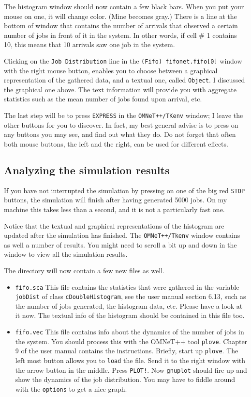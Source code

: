 \documentclass[a4paper]{article}
\begin{document}
The histogram window should now contain a few black bars. When you put
your mouse on one, it will change color. (Mine becomes gray.) There is
a line at the bottom of window that contains the number of arrivals
that observed a certain number of jobs in front of it in the system.
In other words, if cell \# 1 contains 10, this means that 10 arrivals
saw one job in the system.

Clicking on the \texttt{Job Distribution} line in the
\texttt{(Fifo) fifonet.fifo[0]} window with the right mouse button, enables
you to choose between a graphical representation of the gathered data,
and a textual one, called \texttt{Object}. I discussed the graphical
one above. The text information will provide you with aggregate statistics
such as the mean number of jobs found upon arrival, etc.

The last step will be to press \texttt{EXPRESS} in the
\texttt{OMNeT++/TKenv} window; I leave the other
buttons for you to discover. In fact, my best general advise is to
press on any buttons you may see, and find out what they do. Do not
forget that often both mouse buttons, the left and the right, can be
used for different effects.


\subsection{Analyzing the simulation results}
\label{sec:interpreting-results}
If you have not interrupted the simulation by pressing on one of the
big red \texttt{STOP} buttons, the simulation will finish
after having generated 5000 jobs. On my machine this takes less than a
second, and it is not a particularly fast one.

Notice that the textual and graphical representations of the histogram
are updated after the simulation has finished. The
\texttt{OMNeT++/Tkenv} window contains as well a number of results.
You might need to scroll a bit up and down in the window to view all
the simulation results.

The directory will now contain a few new files as well.
\begin{itemize}
\item \texttt{fifo.sca} This file contains the statistics that were
  gathered in the variable \texttt{jobDist} of class
  \texttt{cDoubleHistogram}, see the user manual section 6.13, such as
  the number of jobs generated, the histogram data, etc. Please have a
  look at it now.  The textual info of the histogram should be
  contained in this file too.
\item \texttt{fifo.vec} This file contains info about the dynamics of
  the number of jobs in the system. You should process this with the
  OMNeT++ tool \texttt{plove}. Chapter 9 of the user manual contains
  the instructions.  Briefly, start up \texttt{plove}. The left most
  button allows you to \texttt{load} the file. Send it to the right
  window with the arrow button in the middle. Press \texttt{PLOT!}.
  Now \texttt{gnuplot} should fire up and show the dynamics of the job
  distribution. You may have to fiddle around with the
  \texttt{options} to get a nice graph.
\end{itemize}
\end{document}
